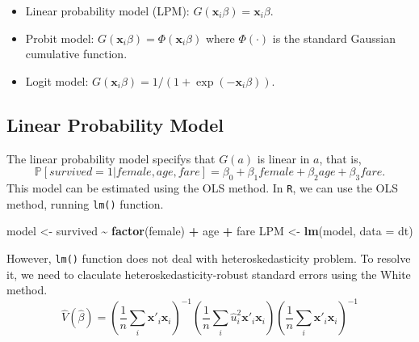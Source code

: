 \documentclass[
  12pt,
]{article}
\newenvironment{Shaded}{\begin{snugshade}}{\end{snugshade}}
\newcommand{\DataTypeTok}[1]{\textcolor[rgb]{0.13,0.29,0.53}{#1}}
\newcommand{\KeywordTok}[1]{\textcolor[rgb]{0.13,0.29,0.53}{\textbf{#1}}}
\newcommand{\NormalTok}[1]{#1}
\newcommand{\OperatorTok}[1]{\textcolor[rgb]{0.81,0.36,0.00}{\textbf{#1}}}
\newcommand{\StringTok}[1]{\textcolor[rgb]{0.31,0.60,0.02}{#1}}
\providecommand{\tightlist}{%
  \setlength{\itemsep}{0pt}\setlength{\parskip}{0pt}}
\begin{document}
\begin{itemize}
\tightlist
\item
  Linear probability model (LPM):
  \(G(\mathbf{x}_i \beta) = \mathbf{x}_i \beta\).
\item
  Probit model: \(G(\mathbf{x}_i \beta) = \Phi(\mathbf{x}_i \beta)\)
  where \(\Phi(\cdot)\) is the standard Gaussian cumulative function.
\item
  Logit model:
  \(G(\mathbf{x}_i \beta) = 1/(1 + \exp(-\mathbf{x}_i \beta))\).
\end{itemize}

\hypertarget{linear-probability-model}{%
\subsection{Linear Probability Model}\label{linear-probability-model}}

The linear probability model specifys that \(G(a)\) is linear in \(a\),
that is, \begin{equation*}
  \mathbb{P}[survived = 1 | female, age, fare]
  = \beta_0 + \beta_1 female + \beta_2 age + \beta_3 fare.
\end{equation*} This model can be estimated using the OLS method. In
\texttt{R}, we can use the OLS method, running \texttt{lm()} function.

\begin{Shaded}
\begin{Highlighting}[]
\NormalTok{model \textless{}{-}}\StringTok{ }\NormalTok{survived }\OperatorTok{\textasciitilde{}}\StringTok{ }\KeywordTok{factor}\NormalTok{(female) }\OperatorTok{+}\StringTok{ }\NormalTok{age }\OperatorTok{+}\StringTok{ }\NormalTok{fare}
\NormalTok{LPM \textless{}{-}}\StringTok{ }\KeywordTok{lm}\NormalTok{(model, }\DataTypeTok{data =}\NormalTok{ dt)}
\end{Highlighting}
\end{Shaded}

However, \texttt{lm()} function does not deal with heteroskedasticity
problem. To resolve it, we need to claculate heteroskedasticity-robust
standard errors using the White method. \begin{equation*}
  \hat{V}(\hat{\beta}) =
  \left( \frac{1}{n} \sum_i \mathbf{x}'_i \mathbf{x}_i  \right)^{-1}
  \left( \frac{1}{n} \sum_i \hat{u}_i^2 \mathbf{x}'_i \mathbf{x}_i \right)
  \left( \frac{1}{n} \sum_i \mathbf{x}'_i \mathbf{x}_i \right)^{-1}
\end{equation*}
\end{document}
